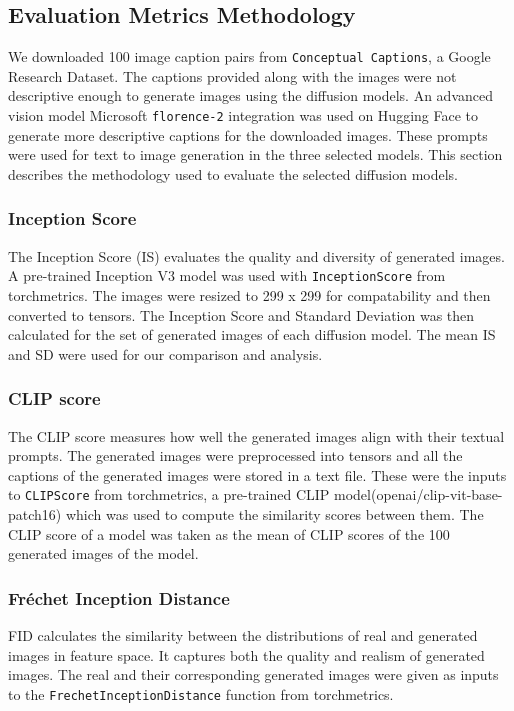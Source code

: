 \documentclass{article}
\begin{document}
\subsection{Evaluation Metrics Methodology}
We downloaded 100 image caption pairs from \texttt{Conceptual Captions}, a Google Research Dataset. 
The captions provided along with the images were not descriptive enough to generate images 
using the diffusion models. An advanced vision model Microsoft \texttt{florence-2} integration was used on Hugging Face 
to generate more descriptive captions for the downloaded images. These prompts were used for text to image generation 
in the three selected models. This section describes the methodology used to evaluate the selected diffusion models. 

\subsubsection{Inception Score}
The Inception Score (IS) evaluates the quality and diversity of generated images. A pre-trained Inception V3 model was used with 
\texttt{InceptionScore} from torchmetrics. The images were resized to 299 x 299 for compatability and then converted to tensors. The Inception Score
and Standard Deviation was then calculated for the set of generated images of each diffusion model. The mean IS and SD were used for our comparison and analysis.

\subsubsection{CLIP score}
The CLIP score measures how well the generated images align with their textual prompts. The generated images were 
preprocessed into tensors and all the captions of the generated images were stored in a text file. These were the inputs to \texttt{CLIPScore} from 
torchmetrics, a pre-trained CLIP model(openai/clip-vit-base-patch16) which was 
used to compute the similarity scores between them. The CLIP score of a model was taken as the mean of CLIP scores 
of the 100 generated images of the model. 

\subsubsection{Fréchet Inception Distance}
FID calculates the similarity between the distributions of real and generated images 
in feature space. It captures both the quality and realism of generated images. The real and their corresponding generated images 
were given as inputs to the \texttt{FrechetInceptionDistance} function from torchmetrics.
\end{document}
